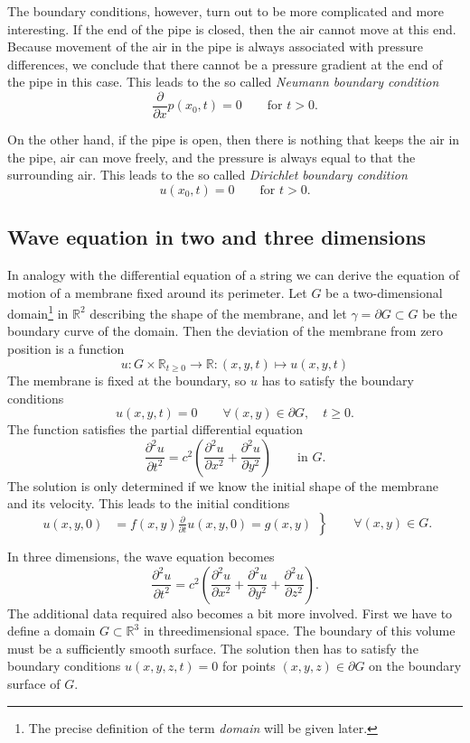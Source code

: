 The boundary conditions, however, turn out to be more complicated and more
interesting.
If the end of the pipe is closed, then the air cannot move at this end.
Because movement of the air in the pipe is always associated with pressure
differences, we conclude that there cannot be a pressure gradient at the
end of the pipe in this case.
This leads to the so called {\em Neumann boundary condition}
\[
\frac{\partial}{\partial x}p(x_0,t) = 0\qquad \text{for $t>0.$}
\]

On the other hand, if the pipe is open, then there is nothing that keeps
the air in the pipe, air can move freely, and the pressure is always equal
to that the surrounding air.
This leads to the so called {\em Dirichlet boundary condition}
\[
u(x_0,t)=0\qquad \text{for $t>0.$}
\]

\subsection{Wave equation in two and three dimensions}
In analogy with the differential equation of a string we can derive the
equation of motion of a membrane fixed around its perimeter.
Let $G$ be a two-dimensional domain\footnote{The precise definition of
the term {\em domain} will be given later.}
in $\mathbb R^2$ describing the shape
of the membrane, and let $\gamma=\partial G\subset G$ be
the boundary curve of the domain.
Then the deviation of the membrane from zero position is a function
\[
 u \colon G\times \mathbb R_{t \ge 0}\to\mathbb R\colon (x,y,t)\mapsto  u (x,y,t)
\]
The membrane is fixed at the boundary, so $u$ has to satisfy the
boundary conditions
\[
 u (x,y,t)=0\qquad \forall (x,y)\in\partial G,\quad t\ge 0.
\]
The function satisfies the partial differential equation
\[
\frac{\partial^2 u }{\partial t^2}
=
c^2\left(\frac{\partial^2 u }{\partial x^2}
+
\frac{\partial^2 u }{\partial y^2}\right)
\qquad\text{in $G$.}
\]
The solution is only determined if we know the initial shape of the
membrane and its velocity. 
This leads to the initial conditions
\begin{equation}
\left.
\begin{aligned}
 u (x,y,0)&=f(x,y)
\frac{\partial}{\partial t} u(x,y,0)=g(x,y)
\end{aligned}
\right\}\qquad
\forall (x,y)\in G.
\end{equation}

In three dimensions, the wave equation becomes
\[
\frac{\partial^2 u }{\partial t^2}
=c^2\left(\frac{\partial^2 u }{\partial x^2}
+\frac{\partial^2 u }{\partial y^2}
+\frac{\partial^2 u }{\partial z^2}
\right).
\]
The additional data required also becomes a bit more involved.
First we have to define a domain 
$G\subset \mathbb R^3$ in threedimensional space.
The boundary of this volume must be a sufficiently smooth surface.
The solution then has to satisfy the boundary conditions
$u(x,y,z,t) = 0$ for points
$(x,y,z)\in \partial G$ on the boundary surface of $G$.

